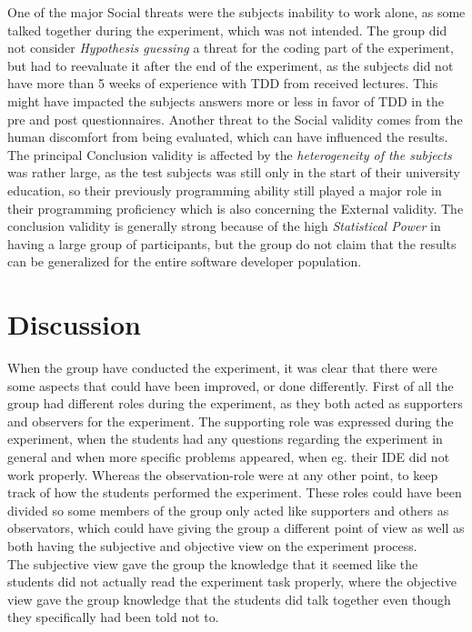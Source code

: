 \documentclass{sig-alternate-05-2015}
\begin{document}
One of the major Social threats were the subjects inability to work alone, as some talked together during the experiment, which was not intended. The group did not consider \textit{Hypothesis guessing} a threat for the coding part of the experiment, but had to reevaluate it after the end of the experiment, as the subjects did not have more than 5  weeks of experience with TDD from received lectures. This might have impacted the subjects answers more or less in favor of TDD in the pre and post questionnaires. Another threat to the Social validity comes from the human discomfort from being evaluated, which can have influenced the results.\\

The principal Conclusion validity is affected by the \textit{heterogeneity of the subjects} was rather large, as the test subjects was still only in the start of their university education, so their previously programming ability still played a major role in their programming proficiency which is also concerning the External validity. The conclusion validity is generally strong because of the high \textit{Statistical Power} in having a large group of participants, but the group do not claim that the results can be generalized for the entire software developer population. 

\section{Discussion}

When the group have conducted the experiment, it was clear that there were some aspects that could have been improved, or done differently. First of all the group had different roles during the experiment, as they both acted as supporters and observers for the experiment. The supporting role was expressed during the experiment, when the students had any questions regarding the experiment in general and when more specific problems appeared, when eg. their IDE did not work properly. Whereas the observation-role were at any other point, to keep track of how the students performed the experiment. These roles could have been divided so some members of the group only acted like supporters and others as observators, which could have giving the group a different point of view as well as both having the subjective and objective view on the experiment process.\\

The subjective view gave the group the knowledge that it seemed like the students did not actually read the experiment task properly, where the objective view gave the group knowledge that the students did talk together even though they specifically had been told not to.
\end{document}
